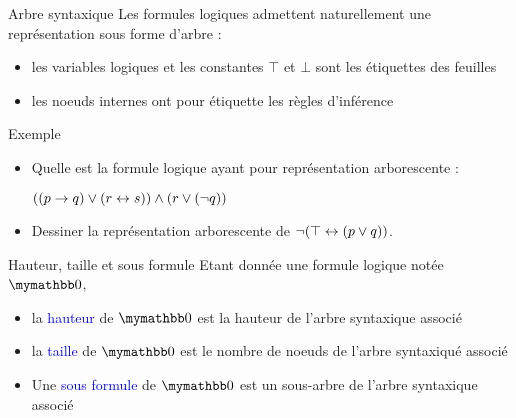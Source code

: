 \documentclass[10pt]{beamer}
\begin{document}
\begin{frame}{\Ctitle}{\stitle}
	\begin{block}{Arbre syntaxique}
		Les formules logiques admettent naturellement une représentation sous forme d'arbre :
		\begin{itemize}
			\item<2-> les variables logiques et les constantes $\top$ et $\bot$ sont les étiquettes des feuilles
			\item<3-> les noeuds internes ont pour étiquette les règles d'inférence
		\end{itemize}
	\end{block}
\end{frame}

\begin{frame}{\Ctitle}{\stitle}
	\begin{exampleblock}{Exemple}
		\begin{itemize}
			\item Quelle est la formule logique ayant pour représentation arborescente :
			      \begin{center}
			      \end{center}
			      \textcolor{OliveGreen}{$ ((p \to q) \vee (r \leftrightarrow s)) \wedge (r \vee (\neg q)) $}
			\item<3-> Dessiner la représentation arborescente de $ \neg(\top \leftrightarrow (p \vee q))$.
		\end{itemize}
	\end{exampleblock}
\end{frame}

\begin{frame}{\Ctitle}{\stitle}
	\begin{block}{Hauteur, taille et sous formule}
		Etant donnée une formule logique notée  $\faux$,
		\begin{itemize}
			\item<2-> la \textcolor{blue}{hauteur} de  $\faux$ est la hauteur de l'arbre syntaxique associé
			\item<3-> la \textcolor{blue}{taille} de  $\faux$ est le nombre de noeuds de l'arbre syntaxiqué associé
			\item<4-> Une \textcolor{blue}{sous formule} de  $\faux$ est un sous-arbre de l'arbre syntaxique associé
		\end{itemize}
	\end{block}
\end{frame}
\end{document}
